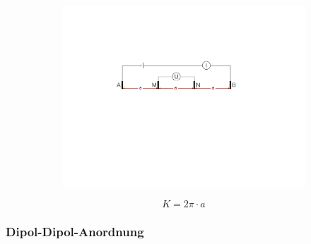 \begin{figure}[H]
	\begin{subfigure}[m]{0.5\textwidth}
	\centering
		\includegraphics[scale = 0.4]{GeoelektrikBilder/WennerAnordnung}
	\end{subfigure}
	\begin{subfigure}[m]{0.5\textwidth}
		\begin{equation*}
				K = 2 \pi \cdot a
		\end{equation*}
	\end{subfigure}
\end{figure}



\subsubsection{Dipol-Dipol-Anordnung}


